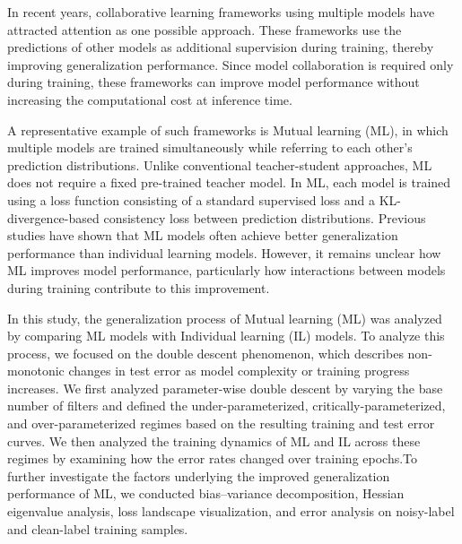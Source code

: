 \documentclass[dvipdfmx]{nolta}
\begin{document}
In recent years, collaborative learning frameworks using multiple models have attracted attention as one possible approach. These frameworks use the predictions of other models as additional supervision during training, thereby improving generalization performance. Since model collaboration is required only during training, these frameworks can improve model performance without increasing the computational cost at inference time.

A representative example of such frameworks is Mutual learning (ML)\cite{zhang_deep_2018}, in which multiple models are trained simultaneously while referring to each other's prediction distributions. Unlike conventional teacher-student approaches, ML does not require a fixed pre-trained teacher model. In ML, each model is trained using a loss function consisting of a standard supervised loss and a KL-divergence-based consistency loss between prediction distributions. Previous studies have shown that ML models often achieve better generalization performance than individual learning models. However, it remains unclear how ML improves model performance, particularly how interactions between models during training contribute to this improvement.

In this study, the generalization process of Mutual learning (ML) was analyzed by comparing ML models with Individual learning (IL) models. To analyze this process, we focused on the double descent phenomenon\cite{belkin_reconciling_2019,nakkiran_deep_2021}, which describes non-monotonic changes in test error as model complexity or training progress increases. We first analyzed parameter-wise double descent by varying the base number of filters and defined the under-parameterized, critically-parameterized, and over-parameterized regimes based on the resulting training and test error curves. We then analyzed the training dynamics of ML and IL across these regimes by examining how the error rates changed over training epochs.To further investigate the factors underlying the improved generalization performance of ML, we conducted bias--variance decomposition, Hessian eigenvalue analysis, loss landscape visualization, and error analysis on noisy-label and clean-label training samples.
\end{document}
